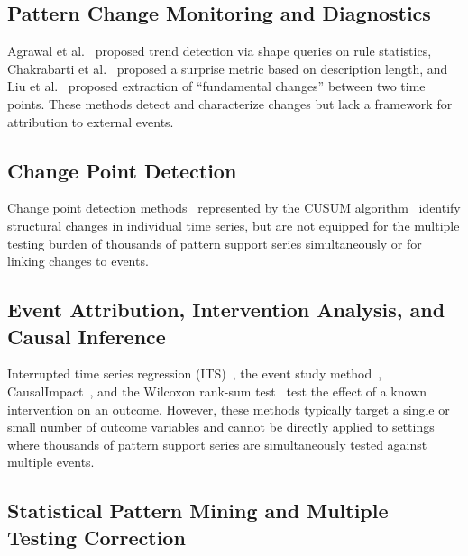 \subsection{Pattern Change Monitoring and Diagnostics}

Agrawal et al.~\cite{agrawal1995active} proposed trend detection via shape queries on rule statistics,
Chakrabarti et al.~\cite{chakrabarti1998mining} proposed a surprise metric based on description length,
and Liu et al.~\cite{liu2001fundamental} proposed extraction of ``fundamental changes'' between two time points.
These methods detect and characterize changes but lack a framework for attribution to external events.

\subsection{Change Point Detection}

Change point detection methods~\cite{aminikhanghahi2017survey}
represented by the CUSUM algorithm~\cite{page1954continuous}
identify structural changes in individual time series,
but are not equipped for the multiple testing burden of thousands of
pattern support series simultaneously or for linking changes to events.

\subsection{Event Attribution, Intervention Analysis, and Causal Inference}

Interrupted time series regression (ITS)~\cite{bernal2017interrupted},
the event study method~\cite{mackinlay1997event},
CausalImpact~\cite{brodersen2015causalimpact},
and the Wilcoxon rank-sum test~\cite{mann1947test}
test the effect of a known intervention on an outcome.
However, these methods typically target a single or small number of outcome variables
and cannot be directly applied to settings where thousands of pattern support series
are simultaneously tested against multiple events.

\subsection{Statistical Pattern Mining and Multiple Testing Correction}

